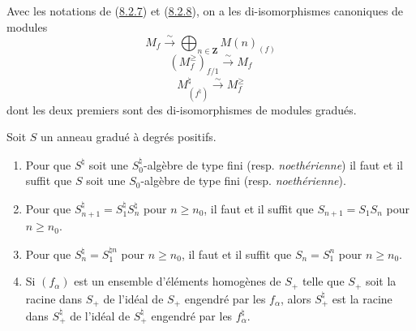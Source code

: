 \begin{lemma}[8.2.9]
\label{II.8.2.9-fr}
Avec les notations de \textup{(\hyperref[II.8.2.7-fr]{8.2.7})} et
\textup{(\hyperref[II.8.2.8-fr]{8.2.8})}, on a les di-isomorphismes canoniques de
modules
\begin{equation}
\label{II.8.2.9.1-fr}
  M_f\xrightarrow{\sim}\bigoplus_{n\in\mathbf{Z}}M(n)_{(f)}
\tag{8.2.9.1}
\end{equation}
\begin{equation}
\label{II.8.2.9.2-fr}
  (M_f^{\geq})_{f/1}\xrightarrow{\sim}M_f
\tag{8.2.9.2}
\end{equation}
\begin{equation}
\label{II.8.2.9.3-fr}
  M^\natural_{(f^\natural)}\xrightarrow{\sim}M_f^{\geq}
\tag{8.2.9.3}
\end{equation}
dont les deux premiers sont des di-isomorphismes de modules gradués.
\end{lemma}

\begin{lemma}[8.2.10]
\label{II.8.2.10-fr}
Soit $S$ un anneau gradué à degrés positifs.
\begin{enumerate}
\item[\rm(i)] Pour que $S^\natural$ soit une $S_0^\natural$-algèbre de type
fini \textup{(resp. \emph{noethérienne})} il faut et il suffit que $S$ soit une $S_0$-algèbre
de type fini \textup{(resp. \emph{noethérienne})}.
\item[\rm(ii)] Pour que $S_{n+1}^\natural=S_1^\natural S_n^\natural$ pour
$n\geq n_0$, il faut et il suffit que $S_{n+1}=S_1S_n$ pour $n\geq n_0$.
\item[\rm(iii)] Pour que $S_n^\natural=S_1^{\natural n}$ pour $n\geq n_0$, il
faut et il suffit que $S_n=S_1^n$ pour $n\geq n_0$.
\item[\rm(iv)] Si $(f_\alpha)$ est un ensemble d'éléments homogènes de $S_+$
telle que $S_+$ soit la racine dans $S_+$ de l'idéal de $S_+$ engendré par
les $f_\alpha$, alors $S_+^\natural$ est la racine dans $S_+^\natural$ de
l'idéal de $S_+^\natural$ engendré par les $f_\alpha^\natural$.
\end{enumerate}
\end{lemma}

